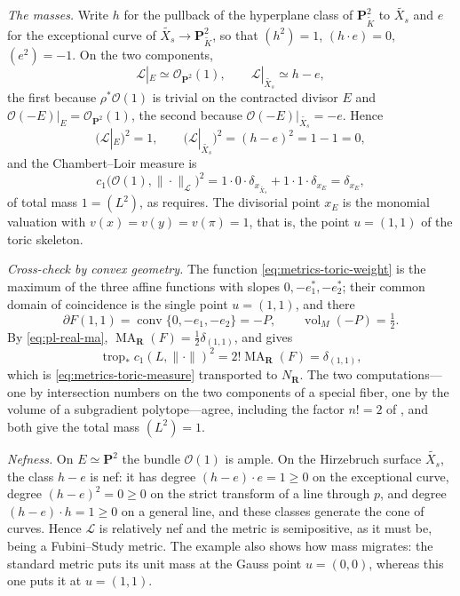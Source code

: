 \begin{example}
\emph{The masses.} Write $h$ for the pullback of the hyperplane class of
$\mathbf P^2_{\widetilde K}$ to $\widetilde{X_s}$ and $e$ for the
exceptional curve of $\widetilde{X_s}\to\mathbf P^2_{\widetilde K}$, so
that $(h^2)=1$, $(h\cdot e)=0$, $(e^2)=-1$. On the two components,
\[
 \mathcal L|_{E}\simeq\mathcal O_{\mathbf P^2}(1),
 \qquad
 \mathcal L|_{\widetilde{X_s}}\simeq h-e,
\]
the first because $\rho^*\mathcal O(1)$ is trivial on the contracted
divisor $E$ and $\mathcal O(-E)|_E=\mathcal O_{\mathbf P^2}(1)$, the
second because $\mathcal O(-E)|_{\widetilde{X_s}}=-e$. Hence
\[
 \bigl(\mathcal L|_{E}\bigr)^2=1,
 \qquad
 \bigl(\mathcal L|_{\widetilde{X_s}}\bigr)^2=(h-e)^2=1-1=0,
\]
and the Chambert--Loir measure is
\begin{equation}
\label{eq:metrics-toric-measure}
 c_1\bigl(\mathcal O(1),\|\cdot\|_{\mathcal L}\bigr)^2
 =1\cdot0\cdot\delta_{x_{\widetilde{X_s}}}+1\cdot1\cdot\delta_{x_E}
 =\delta_{x_E},
\end{equation}
of total mass $1=(L^2)$, as  requires. The
divisorial point $x_E$ is the monomial valuation with
$v(x)=v(y)=v(\pi)=1$, that is, the point $u=(1,1)$ of the toric
skeleton.

\emph{Cross-check by convex geometry.} The function
\eqref{eq:metrics-toric-weight} is the maximum of the three affine functions
with slopes $0,-e_1^*,-e_2^*$; their common domain of coincidence is the
single point $u=(1,1)$, and there
\[
 \partial F(1,1)=\operatorname{conv}\{0,-e_1,-e_2\}=-P,
 \qquad
 \operatorname{vol}_M(-P)=\tfrac12 .
\]
By \eqref{eq:pl-real-ma}, $\operatorname{MA}_{\mathbf R}(F)
=\tfrac12\delta_{(1,1)}$, and
 gives
\[
 \operatorname{trop}_*c_1(L,\|\cdot\|)^2
 =2!\operatorname{MA}_{\mathbf R}(F)
 =\delta_{(1,1)},
\]
which is \eqref{eq:metrics-toric-measure} transported to
$N_{\mathbf R}$. The two computations---one by intersection numbers on the
two components of a special fiber, one by the volume of a subgradient
polytope---agree, including the factor $n!=2$ of
, and both give the total mass
$(L^2)=1$.

\emph{Nefness.} On $E\simeq\mathbf P^2$ the bundle $\mathcal O(1)$ is
ample. On the Hirzebruch surface $\widetilde{X_s}$, the class $h-e$ is
nef: it has degree $(h-e)\cdot e=1\ge0$ on the exceptional curve,
degree $(h-e)^2=0\ge0$ on the strict transform of a line through $p$,
and degree $(h-e)\cdot h=1\ge0$ on a general line, and these classes
generate the cone of curves. Hence $\mathcal L$ is relatively nef and the
metric is semipositive, as it must be, being a Fubini--Study metric. The
example also shows how mass migrates: the standard metric puts its unit mass
at the Gauss point $u=(0,0)$, whereas this one puts it at $u=(1,1)$.
\end{example}

